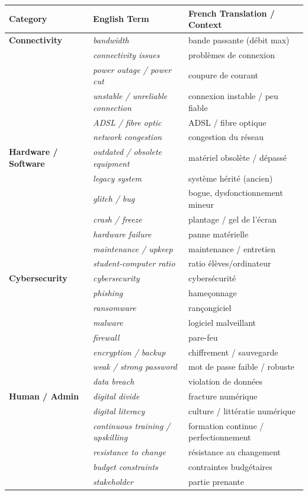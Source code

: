\documentclass[11pt]{article}
\newcommand{\eng}[1]{\ifmmode\text{\textit{#1}}\else\begingroup\selectlanguage{english}\itshape #1\endgroup\fi}
\begin{document}
\begin{aretenir}
\begin{center}
\begin{tabularx}{\linewidth}{|l|X|X|}
\hline
\rowcolor{popblueL}
\textbf{Category} & \textbf{English Term} & \textbf{French Translation / Context} \\
\hline
\textbf{Connectivity} & \eng{bandwidth} & bande passante (débit max) \\
& \eng{connectivity issues} & problèmes de connexion \\
& \eng{power outage / power cut} & coupure de courant \\
& \eng{unstable / unreliable connection} & connexion instable / peu fiable \\
& \eng{ADSL / fibre optic} & ADSL / fibre optique \\
& \eng{network congestion} & congestion du réseau \\
\hline
\textbf{Hardware / Software} & \eng{outdated / obsolete equipment} & matériel obsolète / dépassé \\
& \eng{legacy system} & système hérité (ancien) \\
& \eng{glitch / bug} & bogue, dysfonctionnement mineur \\
& \eng{crash / freeze} & plantage / gel de l'écran \\
& \eng{hardware failure} & panne matérielle \\
& \eng{maintenance / upkeep} & maintenance / entretien \\
& \eng{student-computer ratio} & ratio élèves/ordinateur \\
\hline
\textbf{Cybersecurity} & \eng{cybersecurity} & cybersécurité \\
& \eng{phishing} & hameçonnage \\
& \eng{ransomware} & rançongiciel \\
& \eng{malware} & logiciel malveillant \\
& \eng{firewall} & pare-feu \\
& \eng{encryption / backup} & chiffrement / sauvegarde \\
& \eng{weak / strong password} & mot de passe faible / robuste \\
& \eng{data breach} & violation de données \\
\hline
\textbf{Human / Admin} & \eng{digital divide} & fracture numérique \\
& \eng{digital literacy} & culture / littératie numérique \\
& \eng{continuous training / upskilling} & formation continue / perfectionnement \\
& \eng{resistance to change} & résistance au changement \\
& \eng{budget constraints} & contraintes budgétaires \\
& \eng{stakeholder} & partie prenante \\
\hline
\end{tabularx}
\end{center}
\end{aretenir}
\end{document}
